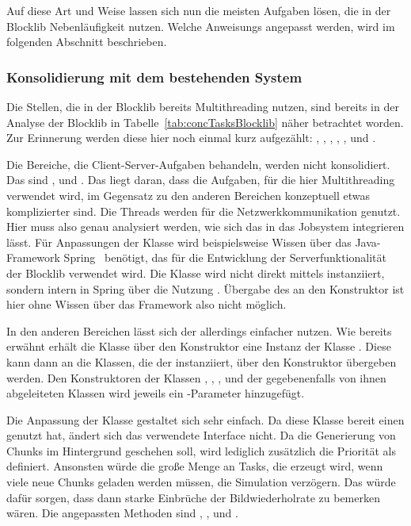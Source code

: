 Auf diese Art und Weise lassen sich nun die meisten Aufgaben lösen, die in der Blocklib Nebenläufigkeit nutzen. Welche \glspl{Anweisung} angepasst werden, wird im folgenden Abschnitt beschrieben.

\subsubsection{Konsolidierung mit dem bestehenden System}\label{sec:Konsolidierung}

Die Stellen, die in der Blocklib bereits Multithreading nutzen, sind bereits in der Analyse der Blocklib in Tabelle~\ref{tab:concTasksBlocklib} näher betrachtet worden. Zur Erinnerung werden diese hier noch einmal kurz aufgezählt: , , , , ,  und .

Die Bereiche, die Client-Server-Aufgaben behandeln, werden nicht konsolidiert. Das sind ,  und . Das liegt daran, dass die Aufgaben, für die hier Multithreading verwendet wird, im Gegensatz zu den anderen Bereichen konzeptuell etwas komplizierter sind. Die Threads werden für die Netzwerkkommunikation genutzt. Hier muss also genau analysiert werden, wie sich das in das Jobsystem integrieren lässt. Für Anpassungen der Klasse  wird beispielsweise Wissen über das Java-Framework Spring~\cite{VMware2022} benötigt, das für die Entwicklung der Serverfunktionalität der Blocklib verwendet wird. Die Klasse wird nicht direkt mittels  instanziiert, sondern intern in Spring über die Nutzung . Übergabe des  an den Konstruktor ist hier ohne Wissen über das Framework also nicht möglich.

In den anderen Bereichen lässt sich der  allerdings einfacher nutzen. Wie bereits erwähnt erhält die Klasse  über den Konstruktor eine Instanz der Klasse . Diese kann dann an die Klassen, die der  instanziiert, über den Konstruktor übergeben werden. Den Konstruktoren der Klassen , , ,  und der gegebenenfalls von ihnen abgeleiteten Klassen wird jeweils ein -Parameter hinzugefügt.

Die Anpassung der Klasse  gestaltet sich sehr einfach. Da diese Klasse bereit einen  genutzt hat, ändert sich das verwendete Interface nicht. Da die Generierung von Chunks im Hintergrund geschehen soll, wird lediglich zusätzlich die Priorität als  definiert. Ansonsten würde die große Menge an Tasks, die erzeugt wird, wenn viele neue Chunks geladen werden müssen, die Simulation verzögern. Das würde dafür sorgen, dass dann starke Einbrüche der Bildwiederholrate zu bemerken wären. Die angepassten Methoden sind	, ,  und .

